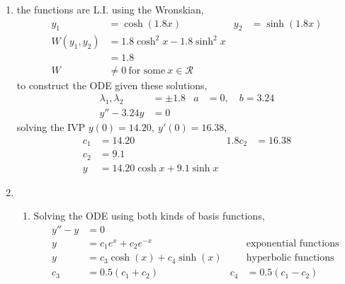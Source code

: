\begin{enumerate}
    \item the functions are L.I. using the Wronskian,
          \begin{align}
              y_{1}           & = \cosh(1.8 x)                             & y_{2} & = \sinh(1.8 x) \\
              W(y_{1}, y_{2}) & = 1.8\cosh^{2}x - 1.8\sinh^{2}x                                     \\
                              & = 1.8                                                               \\
              W               & \neq 0\ \text{for some}\ x \in \mathcal{R}
          \end{align}
          to construct the ODE given these solutions,
          \begin{align}
              \lambda_{1}, \lambda_{2} & = \pm 1.8 & a & = 0, \quad b = 3.24 \\
              y'' - 3.24y              & = 0
          \end{align}
          solving the IVP $ y(0) = 14.20,\ y'(0) = 16.38 $,
          \begin{align}
              c_{1} & = 14.20                       & 1.8c_{2} & = 16.38 \\
              c_{2} & = 9.1                                              \\
              y     & = 14.20 \cosh x + 9.1 \sinh x
          \end{align}

    \item
          \begin{enumerate}
              \item Solving the ODE using both kinds of basis functions,
                    \begin{align}
                        y''  - y & = 0                                                                    \\
                        y        & = c_{1}e^{x} + c_{2}e^{-x}      &       & \text{exponential functions} \\
                        y        & = c_{3}\cosh(x) + c_{4}\sinh(x) &       & \text{hyperbolic functions}  \\
                        c_{3}    & = 0.5(c_{1} + c_{2})            & c_{4} & = 0.5(c_{1} - c_{2})
                    \end{align}


\end{enumerate}
\end{enumerate}
